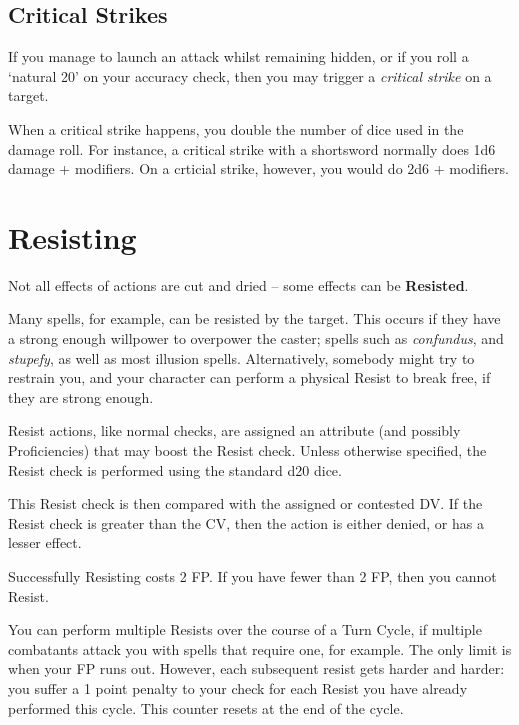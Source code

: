 


\subsection{Critical Strikes}\label{S:Sneak}

If you manage to launch an attack whilst remaining hidden, or if you roll a `natural 20' on your accuracy check, then you may trigger a {\it critical strike} on a target. 

When a critical strike happens, you double the number of dice used in the damage roll. For instance, a critical strike with a shortsword normally does 1d6 damage + modifiers. On a crticial strike, however, you would do 2d6 + modifiers. 


\section{Resisting}

Not all effects of actions are cut and dried -- some effects can be {\bf Resisted}. 

Many spells, for example, can be resisted by the target. This occurs if they have a strong enough willpower to overpower the caster; spells such as {\it confundus}, and {\it stupefy}, as well as most illusion spells. Alternatively, somebody might try to restrain you, and your character can perform a physical Resist to break free, if they are strong enough. 

Resist actions, like normal checks, are assigned an attribute (and possibly Proficiencies) that may boost the Resist check. Unless otherwise specified, the Resist check is performed using the standard d20 dice. 

This Resist check is then compared with the assigned or contested DV. If the Resist check is greater than the CV, then the action is either denied, or has a lesser effect. 

Successfully Resisting costs 2 FP. If you have fewer than 2 FP, then you cannot Resist.

You can perform multiple Resists over the course of a Turn Cycle, if multiple combatants attack you with spells that require one, for example. The only limit is when your FP runs out. However, each subsequent resist gets harder and harder: you suffer a 1 point penalty to your check for each Resist you have already performed this cycle. This counter resets at the end of the cycle.

